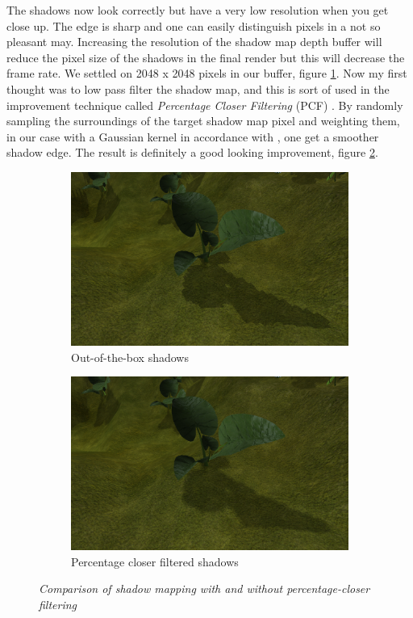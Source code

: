 The shadows now look correctly but have a very low resolution when you get close up. The edge is sharp and one can easily distinguish pixels in a not so pleasant may. Increasing the resolution of the shadow map depth buffer will reduce the pixel size of the shadows in the final render but this will decrease the frame rate. We settled on 2048 x 2048 pixels in our buffer, figure \ref{fig:PCFLvl1}. Now my first thought was to low pass filter the shadow map, and this is sort of used in the improvement technique called \textit{Percentage Closer Filtering} (PCF) \cite{ShadowMapAntialiasing87}\cite{ShadowMapAntialiasing03}. By randomly sampling the surroundings of the target shadow map pixel and weighting them, in our case with a Gaussian kernel in accordance with \cite{CascadeShadowMapping}, one get a smoother shadow edge. The result is definitely a good looking improvement, figure \ref{fig:PCFLvl5}. 

\begin{figure}[H]
\begin{subfigure}{.5\textwidth}
  \centering
  \includegraphics[width=0.9\linewidth]{images/PCFLvl1.jpg}
  \caption{Out-of-the-box shadows}
  \label{fig:PCFLvl1}
\end{subfigure}%
\begin{subfigure}{.5\textwidth}
  \centering
  \includegraphics[width=0.9\linewidth]{images/PCFLvl5.jpg}
  \caption{Percentage closer filtered shadows}
  \label{fig:PCFLvl5}
\end{subfigure}
\caption[Noise comparison]{\textit{Comparison of shadow mapping with and without percentage-closer filtering}}
\label{fig:PCFComparison}
\end{figure}

